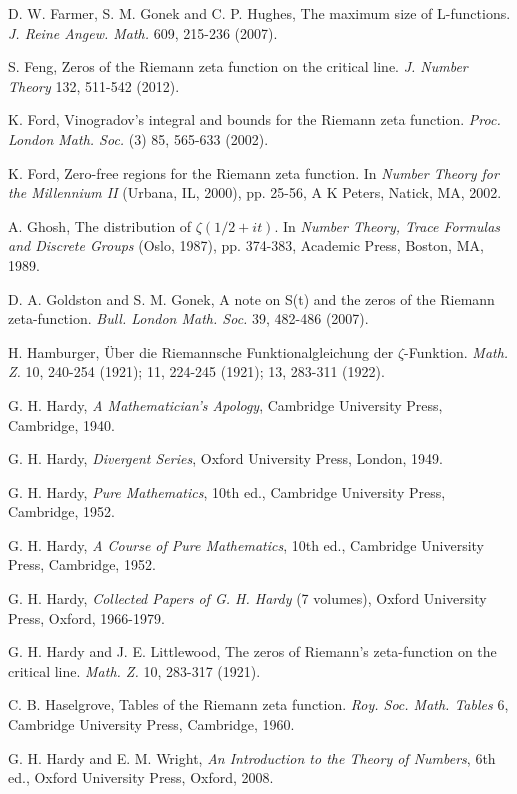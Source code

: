 \documentclass[11pt]{article}
\begin{document}
\begin{thebibliography}{99}
 D. W. Farmer, S. M. Gonek and C. P. Hughes, The maximum size of L-functions. \textit{J. Reine Angew. Math.} 609, 215-236 (2007).

 S. Feng, Zeros of the Riemann zeta function on the critical line. \textit{J. Number Theory} 132, 511-542 (2012).

 K. Ford, Vinogradov's integral and bounds for the Riemann zeta function. \textit{Proc. London Math. Soc.} (3) 85, 565-633 (2002).

 K. Ford, Zero-free regions for the Riemann zeta function. In \textit{Number Theory for the Millennium II} (Urbana, IL, 2000), pp. 25-56, A K Peters, Natick, MA, 2002.

 A. Ghosh, The distribution of $\zeta(1/2+it)$. In \textit{Number Theory, Trace Formulas and Discrete Groups} (Oslo, 1987), pp. 374-383, Academic Press, Boston, MA, 1989.

 D. A. Goldston and S. M. Gonek, A note on S(t) and the zeros of the Riemann zeta-function. \textit{Bull. London Math. Soc.} 39, 482-486 (2007).

 H. Hamburger, Über die Riemannsche Funktionalgleichung der $\zeta$-Funktion. \textit{Math. Z.} 10, 240-254 (1921); 11, 224-245 (1921); 13, 283-311 (1922).

 G. H. Hardy, \textit{A Mathematician's Apology}, Cambridge University Press, Cambridge, 1940.

 G. H. Hardy, \textit{Divergent Series}, Oxford University Press, London, 1949.

 G. H. Hardy, \textit{Pure Mathematics}, 10th ed., Cambridge University Press, Cambridge, 1952.

 G. H. Hardy, \textit{A Course of Pure Mathematics}, 10th ed., Cambridge University Press, Cambridge, 1952.

 G. H. Hardy, \textit{Collected Papers of G. H. Hardy} (7 volumes), Oxford University Press, Oxford, 1966-1979.

 G. H. Hardy and J. E. Littlewood, The zeros of Riemann's zeta-function on the critical line. \textit{Math. Z.} 10, 283-317 (1921).

 C. B. Haselgrove, Tables of the Riemann zeta function. \textit{Roy. Soc. Math. Tables} 6, Cambridge University Press, Cambridge, 1960.

 G. H. Hardy and E. M. Wright, \textit{An Introduction to the Theory of Numbers}, 6th ed., Oxford University Press, Oxford, 2008.


\end{thebibliography}
\end{document}
